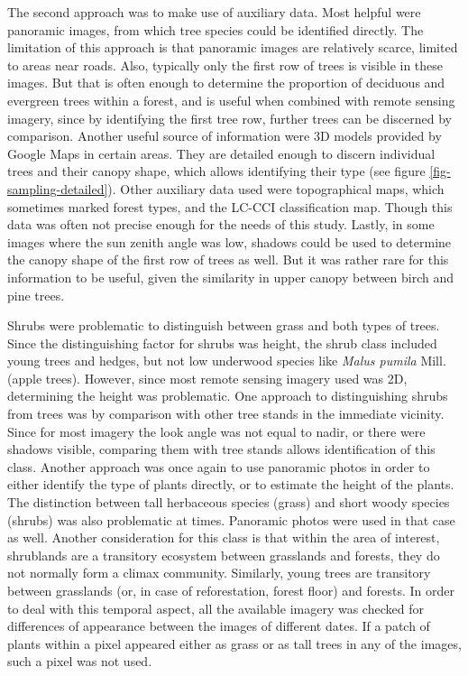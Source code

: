 \documentclass[a4paper,12pt]{scrbook}
\begin{document}
The second approach was to make use of auxiliary data. Most helpful were panoramic images, from which tree species could be identified directly. The limitation of this approach is that panoramic images are relatively scarce, limited to areas near roads. Also, typically only the first row of trees is visible in these images. But that is often enough to determine the proportion of deciduous and evergreen trees within a forest, and is useful when combined with remote sensing imagery, since by identifying the first tree row, further trees can be discerned by comparison. Another useful source of information were 3D models provided by Google Maps in certain areas. They are detailed enough to discern individual trees and their canopy shape, which allows identifying their type (see figure \ref{fig-sampling-detailed}). Other auxiliary data used were topographical maps, which sometimes marked forest types, and the LC-CCI classification map. Though this data was often not precise enough for the needs of this study. Lastly, in some images where the sun zenith angle was low, shadows could be used to determine the canopy shape of the first row of trees as well. But it was rather rare for this information to be useful, given the similarity in upper canopy between birch and pine trees.

Shrubs were problematic to distinguish between grass and both types of trees. Since the distinguishing factor for shrubs was height, the shrub class included young trees and hedges, but not low underwood species like \textit{Malus pumila} Mill. (apple trees). However, since most remote sensing imagery used was 2D, determining the height was problematic. One approach to distinguishing shrubs from trees was by comparison with other tree stands in the immediate vicinity. Since for most imagery the look angle was not equal to nadir, or there were shadows visible, comparing them with tree stands allows identification of this class. Another approach was once again to use panoramic photos in order to either identify the type of plants directly, or to estimate the height of the plants. The distinction between tall herbaceous species (grass) and short woody species (shrubs) was also problematic at times. Panoramic photos were used in that case as well. Another consideration for this class is that within the area of interest, shrublands are a transitory ecosystem between grasslands and forests, they do not normally form a climax community. Similarly, young trees are transitory between grasslands (or, in case of reforestation, forest floor) and forests. In order to deal with this temporal aspect, all the available imagery was checked for differences of appearance between the images of different dates. If a patch of plants within a pixel appeared either as grass or as tall trees in any of the images, such a pixel was not used.
\end{document}
